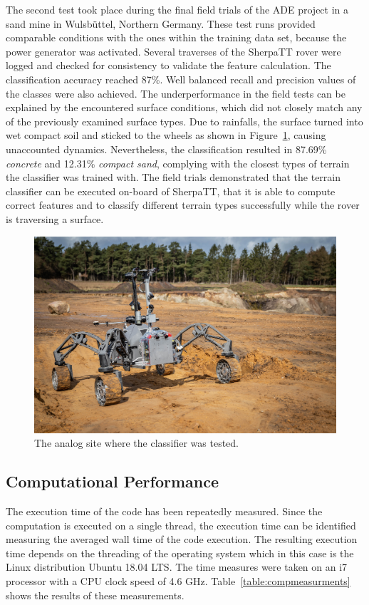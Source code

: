 The second test took place during the final field trials of the ADE project \cite{ocon2021} in a sand mine in Wulsbüttel, Northern Germany.
These test runs provided comparable conditions with the ones within the training data set, because the power generator was activated. 
Several traverses of the SherpaTT rover were logged and checked for consistency to validate the feature calculation. 
The classification accuracy reached 87\%. Well balanced recall and precision values of the classes were also achieved. 
The underperformance in the field tests can be explained by the encountered surface conditions, which did not closely match any of the previously examined surface types. 
Due to rainfalls, the surface turned into wet compact soil and sticked to the wheels as shown in Figure~\ref{fig:finaltest}, causing unaccounted dynamics.
Nevertheless, the classification resulted in 87.69\% \emph{concrete} and 12.31\% \emph{compact sand}, complying with the closest types of terrain the classifier was trained with.
The field trials demonstrated that the terrain classifier can be executed on-board of SherpaTT, that it is able to compute correct features and to classify different terrain types successfully while the rover is traversing a surface.

\begin{figure}[!htbp]
    \centering
        \includegraphics[width=\columnwidth]{../figures/sandmine.jpg}
    \caption{The analog site where the classifier was tested.}
    \label{fig:finaltest}
\end{figure}


\subsection{Computational Performance}
The execution time of the code has been repeatedly measured. 
Since the computation is executed on a single thread, the execution time can be identified measuring the averaged wall time of the code execution. 
The resulting execution time depends on the threading of the operating system which in this case is the Linux distribution Ubuntu 18.04 LTS. The time measures were taken on an i7 processor with a CPU clock speed of 4.6 GHz. 
Table~\ref{table:compmeasurments} shows the results of these measurements. 

